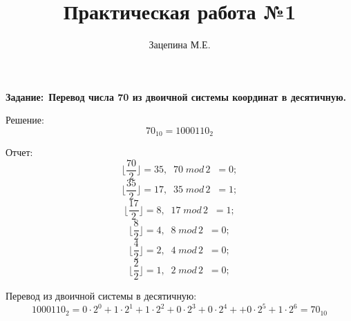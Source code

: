 \documentclass[a4paper,11pt]{article}
\title{Практическая работа №1}
\author{Зацепина М.Е.}
\begin{document}
\maketitle 
\textbf {Задание:\,\,\,Перевод числа 70 из двоичной системы координат в десятичную.}\\[11pt]
\maketitle 
Решение:
$$
70_{10}=1000110_{2}
$$


\maketitle
Отчет:
$$\lfloor
\frac{70}{2}\rfloor=35, \;\;70\; mod\, 2\;\; =0;$$
$$\lfloor
\frac{35}{2}\rfloor=17, \;\;35\; mod\, 2\;\; =1;$$
$$\lfloor
\frac{17}{2}\rfloor=8, \;\;17\; mod\, 2\;\; =1;$$
$$\lfloor
\frac{8}{2}\rfloor=4, \;\;8\; mod\, 2\;\; =0;$$
$$\lfloor
\frac{4}{2}\rfloor=2, \;\;4\; mod\, 2\;\; =0;$$
$$\lfloor
\frac{2}{2}\rfloor=1, \;\;2\; mod\, 2\;\; =0;$$

\maketitle
Перевод из двоичной системы в десятичную:
$$
1000110_2=0\cdot 2^0+1\cdot2^1+1\cdot2^2+0\cdot2^3+0\cdot 2^4+
+0\cdot 2^5+1\cdot 2^6={70}_{10}
$$
\end{document}

